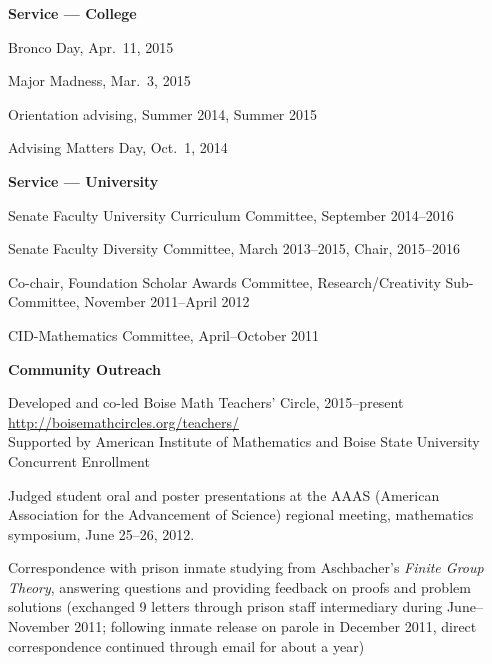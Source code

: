 \documentclass[12pt]{article}
\begin{document}
\textbf{Service --- College}
\begin{description}
\setlength{}
\item[] Bronco Day, Apr.\ 11, 2015
\item[] Major Madness, Mar.\ 3, 2015
\item[] Orientation advising, Summer 2014, Summer 2015
\item[] Advising Matters Day, Oct.\ 1, 2014
\end{description}


\textbf{Service --- University}
\begin{description}
\setlength{}
\item[] Senate Faculty University Curriculum Committee, September 2014--2016

\item[] Senate Faculty Diversity Committee, March 2013--2015, Chair, 2015--2016

\item[] Co-chair, Foundation Scholar Awards Committee, Research/Creativity Sub-Committee, November 2011--April 2012

\item[] CID-Mathematics Committee, April--October 2011
\end{description}

\textbf{Community Outreach}
\begin{description}
\setlength{}
\item[] Developed and co-led Boise Math Teachers' Circle, 2015--present \\
\url{http://boisemathcircles.org/teachers/} \\
Supported by American Institute of Mathematics and Boise State University Concurrent Enrollment

\item[] Judged student oral and poster presentations
at the AAAS (American Association for the Advancement of Science)
regional meeting, mathematics symposium,
June 25--26, 2012.

\item[] Correspondence with prison inmate studying from Aschbacher's \textit{Finite Group Theory},
answering questions and providing feedback on proofs and problem solutions
(exchanged 9 letters through prison staff intermediary during June--November 2011;
following inmate release on parole in December 2011, direct correspondence continued through email for about a year)

\end{description}
\end{document}
